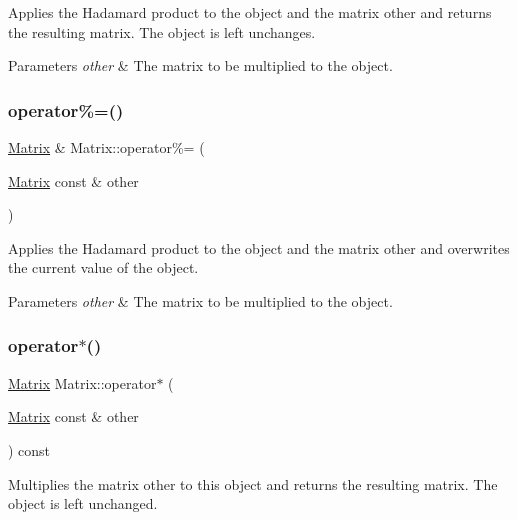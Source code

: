 Applies the Hadamard product to the object and the matrix {\ttfamily other} and returns the resulting matrix. The object is left unchanges.


\begin{DoxyParams}{Parameters}
{\em other} & The matrix to be multiplied to the object. \\
\hline
\end{DoxyParams}
\mbox{\label{classMatrix_ac391b0910e9f0fc0a6e23c9346cee2ad}} 
\subsubsection{\texorpdfstring{operator\%=()}{operator\%=()}}
{\footnotesize\ttfamily \hyperlink{classMatrix}{Matrix} \& Matrix\+::operator\%= (\begin{DoxyParamCaption}\item[{\hyperlink{classMatrix}{Matrix} const \&}]{other }\end{DoxyParamCaption})}

Applies the Hadamard product to the object and the matrix {\ttfamily other} and overwrites the current value of the object.


\begin{DoxyParams}{Parameters}
{\em other} & The matrix to be multiplied to the object. \\
\hline
\end{DoxyParams}
\mbox{\label{classMatrix_a087f5fbe295229d2790871bb14b6a2a5}} 
\subsubsection{\texorpdfstring{operator$\ast$()}{operator*()}\hspace{0.1cm}{\footnotesize\ttfamily [1/2]}}
{\footnotesize\ttfamily \hyperlink{classMatrix}{Matrix} Matrix\+::operator$\ast$ (\begin{DoxyParamCaption}\item[{\hyperlink{classMatrix}{Matrix} const \&}]{other }\end{DoxyParamCaption}) const}

Multiplies the matrix {\ttfamily other} to this object and returns the resulting matrix. The object is left unchanged.


